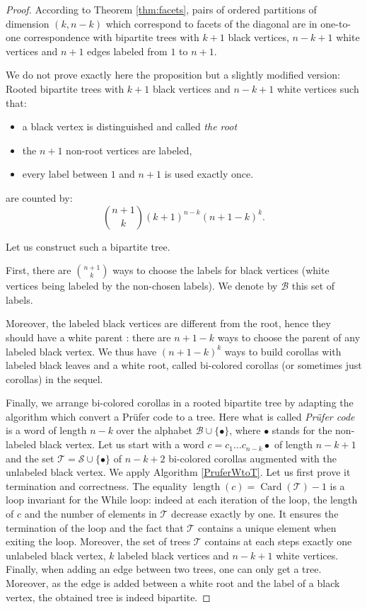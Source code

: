 \begin{proof}
According to Theorem \cref{thm:facets}, pairs of ordered partitions of dimension $(k,n-k)$ which correspond to facets of the diagonal are in one-to-one correspondence with bipartite trees with $k+1$ black vertices, $n-k+1$ white vertices and $n+1$ edges labeled from $1$ to $n+1$.

We do not prove exactly here the proposition but a slightly modified version: 
Rooted bipartite trees with $k+1$ black vertices and $n-k+1$ white vertices such that:
\begin{itemize}
\item a black vertex is distinguished and called \emph{the root}
\item the $n+1$ non-root vertices are labeled,
\item every label between $1$ and $n+1$ is used exactly once.
\end{itemize}
are counted by:
\begin{equation}
\binom{n+1}{k}(k+1)^{n-k}(n+1-k)^{k}.
\end{equation}

Let us construct such a bipartite tree. 

First, there are $\binom{n+1}{k}$ ways to  choose the labels for black vertices (white vertices being labeled by the non-chosen labels). 
We denote by $\mathcal{B}$ this set of labels.

Moreover, the labeled black vertices are different from the root, hence they should have a white parent : there are $n+1-k$ ways to choose the parent of any labeled black vertex. 
We thus have  $(n+1-k)^{k}$ ways to build corollas with labeled black leaves and a white root, called bi-colored corollas (or sometimes just corollas) in the sequel.

Finally, we arrange bi-colored corollas in a rooted bipartite tree by adapting the algorithm which convert a Prüfer code to a tree. 
Here what is called \emph{Prüfer code} is a word of length $n-k$ over the alphabet $\mathcal{B} \cup \{\bullet\}$, where $\bullet$ stands for the non-labeled black vertex. 
Let us start with a word $c=c_1 \ldots c_{n-k} \bullet$ of length $n-k+1$ and the set $\mathcal{T}=\mathcal{S} \cup \{\bullet\}$ of $n-k+2$ bi-colored corollas augmented with the unlabeled black vertex. 
We apply Algorithm \ref{PruferWtoT}. Let us first prove it termination and correctness. The equality 
$\operatorname{length}(c)=\operatorname{Card}(\mathcal{T})-1$ is a loop invariant for the While loop: indeed at each iteration of the loop, the length of $c$ and the number of elements in $\mathcal{T}$ decrease exactly by one. It ensures the termination of the loop and the fact that $\mathcal{T}$ contains a unique element when exiting the loop. Moreover, the set of trees $\mathcal{T}$ contains at each steps exactly one unlabeled black vertex, $k$ labeled black vertices and $n-k+1$ white vertices. Finally, when adding an edge between two trees, one can only get a tree. Moreover, as the edge is added between a white root and the label of a black vertex, the obtained tree is indeed bipartite.


\end{proof}
